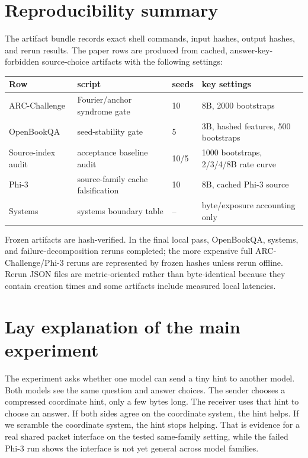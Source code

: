 \documentclass{article}
\newcommand{\arc}{ARC-Challenge}
\newcommand{\obqa}{OpenBookQA}
\begin{document}
\section{Reproducibility summary}

The artifact bundle records exact shell commands, input hashes, output hashes,
and rerun results. The paper rows are produced from cached,
answer-key-forbidden source-choice artifacts with the following settings:

\begin{center}
\scriptsize
\begin{tabular}{llll}
\toprule
Row & script & seeds & key settings \\
\midrule
\arc{} & Fourier/anchor syndrome gate & 10 & 8B, 2000 bootstraps \\
\obqa{} & seed-stability gate & 5 & 3B, hashed features, 500 bootstraps \\
Source-index audit & acceptance baseline audit & 10/5 & 1000 bootstraps, 2/3/4/8B rate curve \\
Phi-3 & source-family cache falsification & 10 & 8B, cached Phi-3 source \\
Systems & systems boundary table & -- & byte/exposure accounting only \\
\bottomrule
\end{tabular}
\end{center}

Frozen artifacts are hash-verified. In the final local pass, \obqa{}, systems,
and failure-decomposition reruns completed; the more expensive full
\arc{}/Phi-3 reruns are represented by frozen hashes unless rerun offline. Rerun
JSON files are metric-oriented rather than byte-identical because they contain
creation times and some artifacts include measured local latencies.

\section{Lay explanation of the main experiment}

The experiment asks whether one model can send a tiny hint to another model. Both models see the same question and answer choices. The sender chooses a compressed coordinate hint, only a few bytes long. The receiver uses that hint to choose an answer. If both sides agree on the coordinate system, the hint helps. If we scramble the coordinate system, the hint stops helping. That is evidence for a real shared packet interface on the tested same-family setting, while the failed Phi-3 run shows the interface is not yet general across model families.
\end{document}
